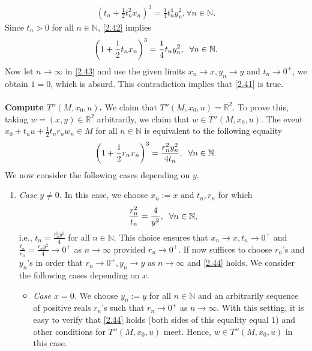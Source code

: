 \documentclass[a4paper]{article}
\numberwithin{equation}{section}
\begin{document}
\begin{enumerate}
\begin{align}
\label{2.42}
{\left( {{t_n} + \frac{1}{2}t_n^2{x_n}} \right)^3} = \frac{1}{4}t_n^4y_n^2,\forall n \in \mathbb{N}.
\end{align}
Since $t_n>0$ for all $n\in \mathbb{N}$, \eqref{2.42} implies
\begin{align}
\label{2.43}
{\left( {1 + \frac{1}{2}{t_n}{x_n}} \right)^3} = \frac{1}{4}{t_n}y_n^2,\hspace{0.2cm}\forall n \in \mathbb{N}.
\end{align}
Now let $n\to \infty$ in \eqref{2.43} and use the given limits $x_n\to x,y_n\to y$ and $t_n\to 0^+$, we obtain $1=0$, which is absurd. This contradiction implies that \eqref{2.41} is true.\\
\\
\textbf{Compute $T''\left( {M,{x_0},u} \right)$.} We claim that $T''\left( {M,{x_0},u} \right) = \mathbb{R}^2$. To prove this, taking $w=\left(x,y\right)\in \mathbb{R}^2$ arbitrarily, we claim that $w\in T''\left(M,x_0,u\right)$. The event $x_0+t_nu+\frac{1}{2}t_nr_nw_n\in M$ for all $n\in \mathbb{N}$ is equivalent to the following equality
\begin{align}
\label{2.44}
{\left( {1 + \frac{1}{2}{r_n}{x_n}} \right)^3} = \frac{{r_n^2y_n^2}}{{4{t_n}}},\hspace{0.2cm}\forall n \in \mathbb{N}.
\end{align}
We now consider the following cases depending on $y$.
\begin{enumerate}
\item \textit{Case $y\ne 0$.} In this case, we choose $x_n:=x$  and $t_n,r_n$ for which
\begin{align}
\frac{{r_n^2}}{{{t_n}}} = \frac{4}{{{y^2}}},\hspace{0.2cm}\forall n \in \mathbb{N},
\end{align}
i.e., ${t_n} = \frac{{r_n^2{y^2}}}{4}$ for all $n\in \mathbb{N}$. This choice ensures that $x_n\to x,t_n\to 0^+$ and $\frac{t_n}{r_n}=\frac{r_n y^2}{4}\to 0^+$ as $n\to \infty$ provided $r_n\to 0^+$. If now suffices to choose $r_n$'s and $y_n$'s in order that $r_n\to 0^+,y_n\to y$ as $n\to \infty$ and \eqref{2.44} holds. We consider the following cases depending on $x$. 
\begin{itemize}
\item \textit{Case $x= 0$.} We choose $y_n:=y$ for all $n\in \mathbb{N}$ and an arbitrarily sequence of positive reals $r_n$'s such that $r_n\to 0^+$ as $n\to \infty$. With this setting, it is easy to verify that \eqref{2.44} holds (both sides of this equality equal $1$) and other conditions for $T''\left(M,x_0,u\right)$ meet. Hence, $w\in T''\left(M,x_0,u\right)$ in this case.

\end{itemize}
\end{enumerate}
\end{enumerate}
\end{document}
